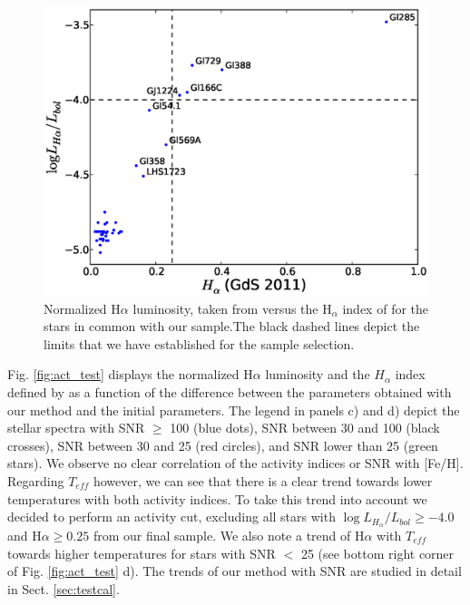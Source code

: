 \documentclass[referee]{aa}
\begin{document}
\begin{figure}[]
\centering
\includegraphics[scale=0.45]{pics/activity.eps}
\caption{Normalized H$\alpha$ luminosity, taken from \citet{Reiners-2012} versus the H$_{\alpha}$ index of \citet{Gomes_da_Silva-2011} for the stars in common with our sample.The black dashed lines depict the limits that we have established for the sample selection.}
\label{fig:activity}
\end{figure}

Fig. \ref{fig:act_test} displays the normalized H$\alpha$ luminosity and the $H_{\alpha}$ index defined by \citet{Gomes_da_Silva-2011}  as a function of the difference between the parameters obtained with our method and the initial parameters. The legend in panels c) and d) depict the stellar spectra with SNR $\geq$ 100 (blue dots), SNR between 30 and 100 (black crosses), SNR between 30 and 25 (red circles), and SNR lower than 25 (green stars). We observe no clear correlation of the activity indices or SNR with [Fe/H]. Regarding $T_{eff}$ however, we can see that there is a clear trend towards lower temperatures with both activity indices. To take this trend into account we decided to perform an activity cut, excluding all stars with $\log{L_{H_{\alpha}}/L_{bol}} \geq -4.0 $ and H$\alpha \geq 0.25$ from our final sample. We also note a trend of H$\alpha$ with $T_{eff}$ towards higher temperatures for stars with SNR $<$ 25 (see bottom right corner of Fig. \ref{fig:act_test} d). The trends of our method with SNR are studied in detail in Sect. \ref{sec:testcal}. 
\end{document}
